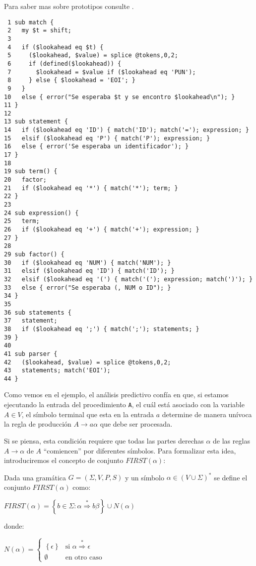 Para saber mas sobre prototipos consulte .

\begin{program}
\label{program:adrp}
\begin{verbatim}
 1 sub match {
 2   my $t = shift;
 3 
 4   if ($lookahead eq $t) {
 5     ($lookahead, $value) = splice @tokens,0,2; 
 6     if (defined($lookahead)) { 
 7       $lookahead = $value if ($lookahead eq 'PUN');
 8     } else { $lookahead = 'EOI'; }
 9   }
10   else { error("Se esperaba $t y se encontro $lookahead\n"); }
11 }
12 
13 sub statement {
14   if ($lookahead eq 'ID') { match('ID'); match('='); expression; }
15   elsif ($lookahead eq 'P') { match('P'); expression; }
16   else { error('Se esperaba un identificador'); }
17 }
18 
19 sub term() {
20   factor;
21   if ($lookahead eq '*') { match('*'); term; }
22 }
23 
24 sub expression() {
25   term;
26   if ($lookahead eq '+') { match('+'); expression; }
27 }
28 
29 sub factor() {
30   if ($lookahead eq 'NUM') { match('NUM'); }
31   elsif ($lookahead eq 'ID') { match('ID'); }
32   elsif ($lookahead eq '(') { match('('); expression; match(')'); }
33   else { error("Se esperaba (, NUM o ID"); }
34 }
35 
36 sub statements {
37   statement;
38   if ($lookahead eq ';') { match(';'); statements; }
39 }
40 
41 sub parser {
42   ($lookahead, $value) = splice @tokens,0,2; 
43   statements; match('EOI');
44 }
\end{verbatim}
\end{program}

Como vemos en el ejemplo, el análisis predictivo confía en que, si estamos
ejecutando la entrada del procedimiento \verb|A|,
el cuál está asociado con la variable $A \in V$, el símbolo terminal
que esta en la entrada $a$  determine de manera unívoca la regla
de producción $A \rightarrow a \alpha$ que debe ser procesada.

Si se piensa, esta condición requiere que todas las partes derechas $\alpha$ de
las reglas $A \rightarrow \alpha$ de $A$ ``comiencen'' por diferentes símbolos.
Para formalizar esta idea, introduciremos el concepto de
conjunto $FIRST(\alpha)$:

\begin{definition}
Dada una gramática 
$G=(\Sigma,V,P,S)$ y un símbolo $\alpha \in (V \cup \Sigma)^*$ se define el conjunto 
$FIRST(\alpha)$ como:

$FIRST(\alpha) = \left \{ b \in \Sigma :  \alpha  \stackrel{*}{\Longrightarrow}  b \beta \right \}
\cup N(\alpha)$ 

\noindent donde:

$N(\alpha) = \left \{ \begin{array}{ll}
                         \left \{ \epsilon \right \}& \mbox{si $\alpha \stackrel{*}{\Longrightarrow} \epsilon$} \\
                         \emptyset & \mbox{en otro caso} 
                      \end{array}
             \right. $ 

\end{definition}


